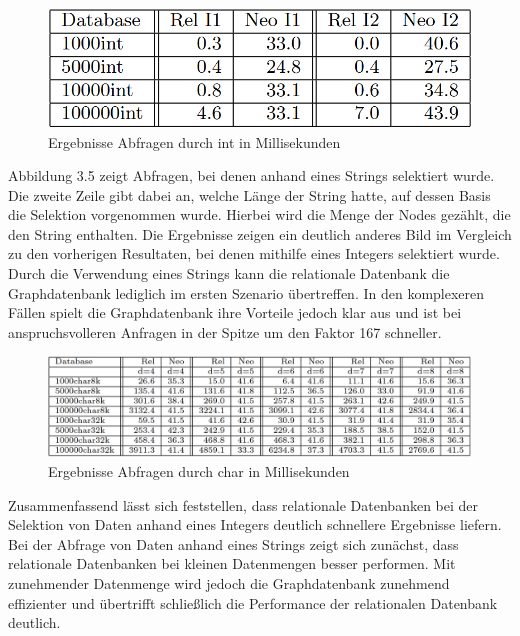  \citep{graphrelationaldb}
\begin{figure}[H]
	\centering
	\includegraphics[scale=.5]{Illustrations/dbresultsint.png}
	\caption{Ergebnisse Abfragen durch int in Millisekunden \citep{graphrelationaldb}}
\end{figure}
\noindent
Abbildung 3.5 zeigt Abfragen, bei denen anhand eines Strings selektiert wurde. Die zweite Zeile gibt dabei an, welche Länge der String hatte, auf dessen Basis die Selektion vorgenommen wurde. Hierbei wird die Menge der Nodes gezählt, die den String enthalten. Die Ergebnisse zeigen ein deutlich anderes Bild im Vergleich zu den vorherigen Resultaten, bei denen mithilfe eines Integers selektiert wurde. Durch die Verwendung eines Strings kann die relationale Datenbank die Graphdatenbank lediglich im ersten Szenario übertreffen. In den komplexeren Fällen spielt die Graphdatenbank ihre Vorteile jedoch klar aus und ist bei anspruchsvolleren Anfragen in der Spitze um den Faktor 167 schneller.
 \citep{graphrelationaldb}
\begin{figure}[H]
	\centering
	\includegraphics[scale=.425]{Illustrations/dbresultschar.png}
	\caption{Ergebnisse Abfragen durch char in Millisekunden \citep{graphrelationaldb}}
\end{figure}
\noindent
Zusammenfassend lässt sich feststellen, dass relationale Datenbanken bei der Selektion von Daten anhand eines Integers deutlich schnellere Ergebnisse liefern. Bei der Abfrage von Daten anhand eines Strings zeigt sich zunächst, dass relationale Datenbanken bei kleinen Datenmengen besser performen. Mit zunehmender Datenmenge wird jedoch die Graphdatenbank zunehmend effizienter und übertrifft schließlich die Performance der relationalen Datenbank deutlich.
